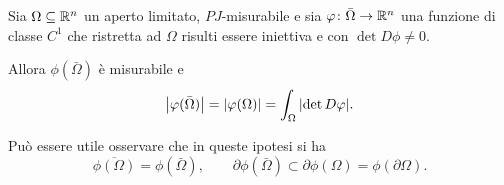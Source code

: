\begin{theorem}
  \label{th:formula_volume}
Sia $\Omega\subseteq {\mathbb R}^n$ un aperto limitato, $PJ$-misurabile e sia 
$\varphi\colon \bar \Omega\to {\mathbb R}^n$
una funzione di classe $C^1$ che ristretta ad $\Omega$ risulti essere 
iniettiva e con $\det D\phi\neq 0$.

Allora $\phi(\bar \Omega)$ è misurabile e
\begin{equation}\label{eq:area}
 {\left|\varphi(\bar \Omega)\right|} = {\left|\varphi(\Omega)\right|} = \int_\Omega {\left|\det D\varphi\right|}.
\end{equation}

Può essere utile osservare che in queste ipotesi si ha
\begin{equation}\label{eq:49638}
  \overline{\phi(\Omega)} = \phi(\bar \Omega), \qquad
          \partial \phi(\bar \Omega)
  \subset \partial \phi(\Omega)
  = \phi(\partial \Omega).
\end{equation}
\end{theorem}
%
